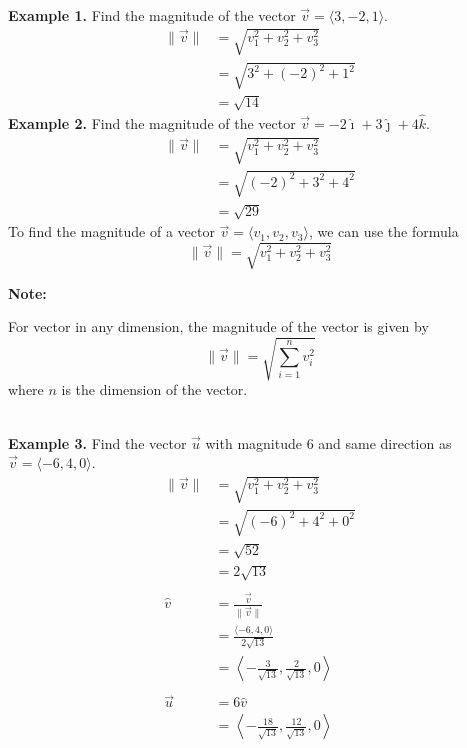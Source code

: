 \documentclass{report}
\begin{document}
~\\
\noindent\textbf{Example 1. } Find the magnitude of the vector $\vec{v} = \langle 3, -2, 1 \rangle$.
\begin{align*}
    \lVert \vec{v} \rVert & = \sqrt{v_1^2 + v_2^2 + v_3^2} \\
                          & = \sqrt{3^2 + (-2)^2 + 1^2}    \\
                          & = \sqrt{14}
\end{align*}
\noindent\textbf{Example 2. } Find the magnitude of the vector $\vec{v} = -2\hat{\imath} + 3\hat{\jmath} + 4\hat{k}$.
\begin{align*}
    \lVert \vec{v} \rVert & = \sqrt{v_1^2 + v_2^2 + v_3^2} \\
                          & = \sqrt{(-2)^2 + 3^2 + 4^2}    \\
                          & = \sqrt{29}
\end{align*}
To find the magnitude of a vector $\vec{v} = \langle v_1, v_2, v_3 \rangle$, we can use the formula \[\lVert \vec{v} \rVert = \sqrt{v_1^2 + v_2^2 + v_3^2}\]
\begin{framed}
    \noindent\textbf{Note: }

    \noindent For vector in any dimension, the magnitude of the vector is given by \[\lVert \vec{v} \rVert = \sqrt{\sum_{i=1}^{n} v_i^2}\] where $n$ is the dimension of the vector.
\end{framed}
~\\
\noindent\textbf{Example 3. } Find the vector $\vec{u}$ with magnitude 6 and same direction as $\vec{v} = \langle -6, 4, 0 \rangle$.
\begin{align*}
    \lVert \vec{v} \rVert & = \sqrt{v_1^2 + v_2^2 + v_3^2}                                              \\
                          & = \sqrt{(-6)^2 + 4^2 + 0^2}                                                 \\
                          & = \sqrt{52}                                                                 \\
                          & = 2\sqrt{13}                                                                \\\\
    \hat{v}               & = \frac{\vec{v}}{\lVert \vec{v} \rVert}                                     \\
                          & = \frac{\langle -6, 4, 0 \rangle}{2\sqrt{13}}                               \\
                          & = \left\langle -\frac{3}{\sqrt{13}}, \frac{2}{\sqrt{13}}, 0 \right\rangle   \\\\
    \vec{u}               & = 6\hat{v}                                                                  \\
                          & = \left\langle -\frac{18}{\sqrt{13}}, \frac{12}{\sqrt{13}}, 0 \right\rangle
\end{align*}
\end{document}
